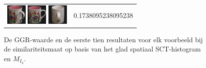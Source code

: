 \begin{figure}[!bp]
\begin{tabular}{m{11cm} | m{3cm} |}
\includegraphics[width=1cm]{coil/beeld-10.eps}
\includegraphics[width=1cm]{coil/beeld-6.eps}
\includegraphics[width=1cm]{coil/beeld-41.eps}
& {\scriptsize 0.1738095238095238}
\\
\end{tabular}
\vspace{5pt}
\caption{\label{fig:results_sct_glad_spatiaal_histgeb}De GGR-waarde en de eerste tien resultaten voor elk 
voorbeeld bij de similariteitsmaat op basis van het glad spatiaal SCT-histogram en $M_{I_3}$.}
\end{figure}